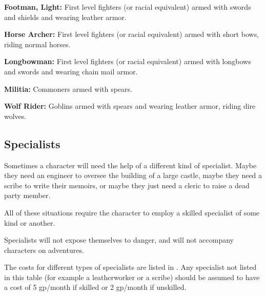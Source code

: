 \begin{multicols*}{2}
\textbf{Footman, Light:} First level fighters (or racial equivalent) armed with swords and shields and wearing leather armor.

\textbf{Horse Archer:} First level fighters (or racial equivalent) armed with short bows, riding normal horses.

\textbf{Longbowman:} First level fighters (or racial equivalent) armed with longbows and swords and wearing chain mail armor.

\textbf{Militia:} Commoners armed with spears.

\textbf{Wolf Rider:} Goblins armed with spears and wearing leather armor, riding dire wolves.

\subsection{Specialists}\label{sec:Specialists}
Sometimes a character will need the help of a different kind of specialist. Maybe they need an engineer to oversee the building of a large castle, maybe they need a scribe to write their memoirs, or maybe they just need a cleric to raise a dead party member.

All of these situations require the character to employ a skilled specialist of some kind or another.

Specialists will not expose themselves to danger, and will not accompany characters on adventures.

The costs for different types of specialists are listed in . Any specialist not listed in this table (for example a leatherworker or a scribe) should be assumed to have a cost of 5 gp/month if skilled or 2 gp/month if unskilled.


\end{multicols*}
